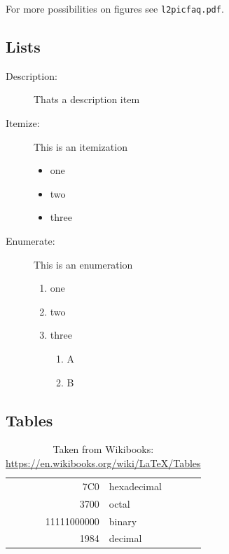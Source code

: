 \documentclass[a4paper,fontsize=12pt,toc=bib]{scrartcl}
\begin{document}
For more possibilities on figures see \texttt{l2picfaq.pdf}.

\subsection{Lists}

\begin{description}
    \item[Description:] Thats a description item

    \item[Itemize:] This is an itemization
        \begin{itemize}
            \item one
            \item two
            \item three
        \end{itemize}

    \item[Enumerate:] This is an enumeration
        \begin{enumerate}
            \item one
            \item two
            \item three
                \begin{enumerate}
                    \item A
                    \item B
                \end{enumerate}
        \end{enumerate}
\end{description}

\subsection{Tables}

\begin{table}[h]
    \centering
    \begin{tabular}{|r|l|}
        \hline
        7C0 & hexadecimal \\
        3700 & octal \\ \cline{2-2}
        11111000000 & binary \\
        \hline \hline
        1984 & decimal \\
        \hline
    \end{tabular}
    \caption{Taken from Wikibooks: \url{https://en.wikibooks.org/wiki/LaTeX/Tables}}
    \label{tab:demo1}
\end{table}
\end{document}
